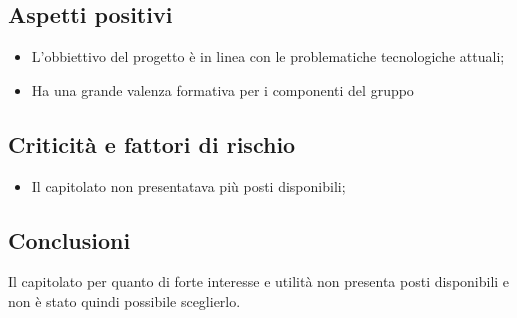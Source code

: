 \subsection{Aspetti positivi}
\begin{itemize}
    \item L'obbiettivo del progetto è in linea con le problematiche tecnologiche attuali;
    \item Ha una grande valenza formativa per i componenti del gruppo
\end{itemize}
\subsection{Criticità e fattori di rischio}
\begin{itemize}
    \item Il capitolato non presentatava più posti disponibili;
\end{itemize}
\subsection{Conclusioni}
Il capitolato per quanto di forte interesse e utilità non presenta posti disponibili e non è stato quindi possibile sceglierlo.